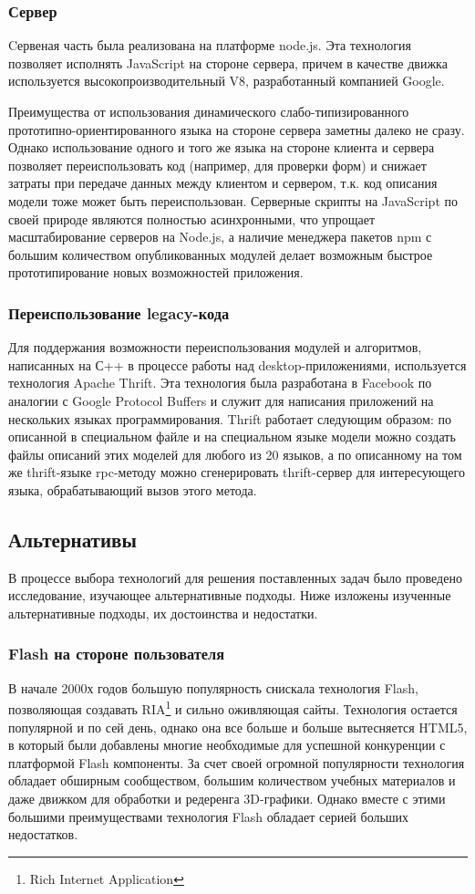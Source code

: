 \documentclass[12pt, a4paper]{article}
\begin{document}
\subsubsection{Сервер}
Cервеная часть была реализована на платформе node.js. Эта технология позволяет
исполнять JavaScript на стороне сервера, причем в качестве движка используется
высокопроизводительный V8, разработанный компанией Google.

Преимущества от использования динамического слабо-типизированного
прототипно-ориентированного языка на стороне сервера заметны далеко не сразу.
Однако использование одного и того же языка на стороне клиента и сервера
позволяет переиспользовать код (например, для проверки форм) и снижает затраты
при передаче данных между клиентом и сервером, т.к. код описания модели тоже может
быть переиспользован. Серверные скрипты на JavaScript по своей природе являются
полностью асинхронными, что упрощает масштабирование серверов на Node.js, а
наличие менеджера пакетов npm с большим количеством опубликованных модулей
делает возможным быстрое прототипирование новых возможностей приложения.

\subsubsection{Переиспользование legacy-кода}
Для поддержания возможности переиспользования модулей и алгоритмов, написанных
на С++ в процессе работы над desktop-приложениями, используется технология
Apache Thrift. Эта технология была разработана в Facebook по аналогии с Google
Protocol Buffers и служит для написания приложений на нескольких языках
программирования. Thrift работает следующим образом: по описанной в специальном
файле и на специальном языке модели можно создать файлы описаний этих моделей
для любого из 20 языков, а по описанному на том же thrift-языке rpc-методу можно
сгенерировать thrift-сервер для интересующего языка, обрабатывающий вызов этого
метода.

\subsection{Альтернативы}
В процессе выбора технологий для решения поставленных задач было проведено исследование,
изучающее альтернативные подходы. Ниже изложены изученные альтернативные
подходы, их достоинства и недостатки.

\subsubsection{Flash на стороне пользователя}
В начале 2000х годов большую популярность снискала технология Flash,
позволяющая создавать RIA\footnote{Rich Internet Application} и
сильно оживляющая сайты. Технология остается популярной и по сей день,
однако она все больше и больше вытесняется HTML5, в который были добавлены
многие необходимые для успешной конкуренции с платформой Flash компоненты.
За счет своей огромной популярности технология обладает обширным сообществом,
большим количеством учебных материалов и даже движком для обработки и редеренга
3D-графики. Однако вместе с этими большими
преимуществами технология Flash обладает серией больших недостатков.
\end{document}
